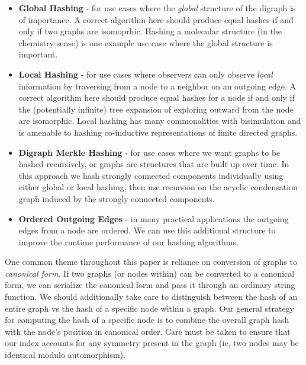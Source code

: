 \documentclass{svproc}
\begin{document}
\begin{itemize}
  \item \textbf{Global Hashing} - for use cases where the \textit{global} structure of the digraph is of importance. A correct algorithm here should produce equal hashes if and only if two graphs are isomoprhic. Hashing a molecular structure (in the chemistry sense) is one example use case where the global structure is important.
  \item \textbf{Local Hashing} - for use cases where observers can only observe \textit{local} information by traversing from a node to a neighbor on an outgoing edge. A correct algorithm here should produce equal hashes for a node if and only if the (potentially infinite) tree expansion of exploring outward from the node are isomorphic. Local hashing has many commonalities with bisimulation and is amenable to hashing co-inductive representations of finite directed graphs.
  \item \textbf{Digraph Merkle Hashing} - for use cases where we want graphs to be hashed recursively, or graphs are structures that are built up over time. In this approach we hash strongly connected components individually using either global or local hashing, then use recursion on the acyclic condensation graph induced by the strongly connected components.
  \item \textbf{Ordered Outgoing Edges} - in many practical applications the outgoing edges from a node are ordered. We can use this additional structure to improve the runtime performance of our hashing algorithms.
\end{itemize}

One common theme throughout this paper is reliance on conversion of graphs to \textit{canonical form}. If two graphs (or nodes within) can be converted to a canonical form, we can serialize the canonical form and pass it through an ordinary string function. We should additionally take care to distinguish between the hash of an entire graph vs the hash of a specific node within a graph. Our general strategy for computing the hash of a specific node is to combine the overall graph hash with the node's position in canonical order. Care must be taken to ensure that our index accounts for any symmetry present in the graph (ie, two nodes may be identical modulo automorphism).

\end{document}
